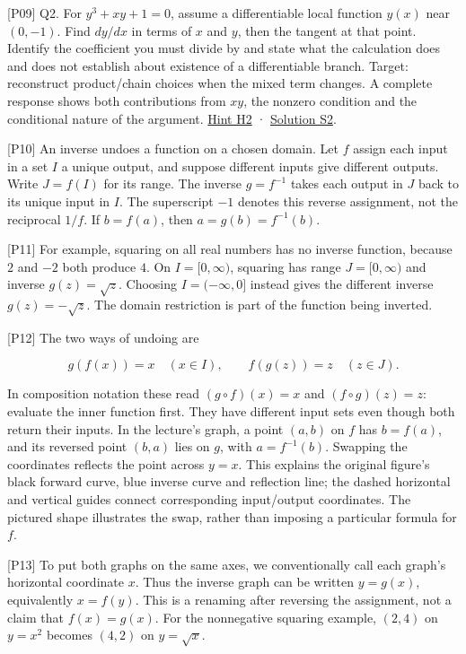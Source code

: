 \documentclass[
  11pt,
]{article}
\begin{document}
{[}P09{]} Q2. For \(y^3+xy+1=0\), assume a differentiable local function
\(y(x)\) near \((0,-1)\). Find \(dy/dx\) in terms of \(x\) and \(y\),
then the tangent at that point. Identify the coefficient you must divide
by and state what the calculation does and does not establish about
existence of a differentiable branch. Target: reconstruct product/chain
choices when the mixed term changes. A complete response shows both
contributions from \(xy\), the nonzero condition and the conditional
nature of the argument. \protect\hyperlink{h2}{Hint H2} ·
\protect\hyperlink{s2}{Solution S2}.

{[}P10{]} An inverse undoes a function on a chosen domain. Let \(f\)
assign each input in a set \(I\) a unique output, and suppose different
inputs give different outputs. Write \(J=f(I)\) for its range. The
inverse \(g=f^{-1}\) takes each output in \(J\) back to its unique input
in \(I\). The superscript \(-1\) denotes this reverse assignment, not
the reciprocal \(1/f\). If \(b=f(a)\), then \(a=g(b)=f^{-1}(b)\).

{[}P11{]} For example, squaring on all real numbers has no inverse
function, because \(2\) and \(-2\) both produce \(4\). On
\(I=[0,\infty)\), squaring has range \(J=[0,\infty)\) and inverse
\(g(z)=\sqrt z\). Choosing \(I=(-\infty,0]\) instead gives the different
inverse \(g(z)=-\sqrt z\). The domain restriction is part of the
function being inverted.

{[}P12{]} The two ways of undoing are

\[
g(f(x))=x\quad(x\in I),\qquad
f(g(z))=z\quad(z\in J).
\]

In composition notation these read \((g\circ f)(x)=x\) and
\((f\circ g)(z)=z\): evaluate the inner function first. They have
different input sets even though both return their inputs. In the
lecture's graph, a point \((a,b)\) on \(f\) has \(b=f(a)\), and its
reversed point \((b,a)\) lies on \(g\), with \(a=f^{-1}(b)\). Swapping
the coordinates reflects the point across \(y=x\). This explains the
original figure's black forward curve, blue inverse curve and reflection
line; the dashed horizontal and vertical guides connect corresponding
input/output coordinates. The pictured shape illustrates the swap,
rather than imposing a particular formula for \(f\).

{[}P13{]} To put both graphs on the same axes, we conventionally call
each graph's horizontal coordinate \(x\). Thus the inverse graph can be
written \(y=g(x)\), equivalently \(x=f(y)\). This is a renaming after
reversing the assignment, not a claim that \(f(x)=g(x)\). For the
nonnegative squaring example, \((2,4)\) on \(y=x^2\) becomes \((4,2)\)
on \(y=\sqrt x\).
\end{document}
